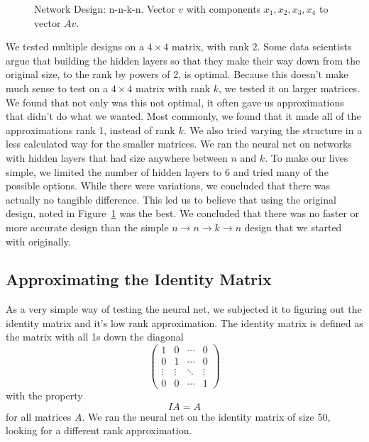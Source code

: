 \documentclass[a4paper,twoside]{article}
\begin{document}
\begin{figure}[H]
\caption{Network Design: n-n-k-n. Vector $v$ with components $x_1, x_2, x_3, x_4$ to vector $Av$.}
\label{fig:originaldesign}
\end{figure}

We tested multiple designs on a $4 \times 4$ matrix, with rank $2$. Some data scientists argue that building the hidden layers so that they make their way down from the original size, to the rank by powers of 2, is optimal. Because this doesn't make much sense to test on a $4 \times 4$ matrix with rank $k$, we tested it on larger matrices. We found that not only was this not optimal, it often gave us approximations that didn't do what we wanted. Most commonly, we found that it made all of the approximations rank 1, instead of rank $k$.
\indent We also tried varying the structure in a less calculated way for the smaller matrices. We ran the neural net on networks with hidden layers that had size anywhere between $n$ and $k$. To make our lives simple, we limited the number of hidden layers to 6 and tried many of the possible options. While there were variations, we concluded that there was actually no tangible difference. This led us to believe that using the original design, noted in Figure~\ref{fig:originaldesign} was the best.
\indent We concluded that there was no faster or more accurate design than the simple $n\rightarrow n\rightarrow k\rightarrow n$ design that we started with originally.

\subsection{Approximating the Identity Matrix}
\label{sec:identity}
\noindent As a very simple way of testing the neural net, we subjected it to figuring out the identity matrix and it's low rank approximation. The identity matrix is defined as the matrix with all 1s down the diagonal
$$\begin{pmatrix}1&0&\cdots&0\\0&1&\cdots&0\\\vdots&\vdots&\ddots&\vdots\\0&0&\cdots&1\end{pmatrix}$$
with the property $$IA = A$$ for all matrices $A$. We ran the neural net on the identity matrix of size 50, looking for a different rank approximation.
\end{document}
